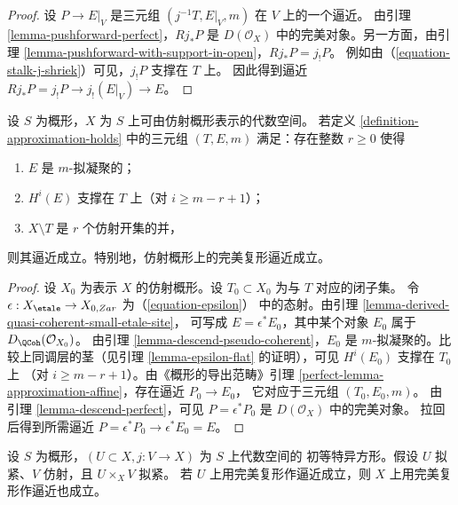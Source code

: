 \begin{proof}
设 $P \to E|_V$ 是三元组 $(j^{-1}T, E|_V, m)$ 在 $V$ 上的一个逼近。
由引理 \ref{lemma-pushforward-perfect}，$Rj_*P$ 是
$D(\mathcal{O}_X)$ 中的完美对象。另一方面，由引理
\ref{lemma-pushforward-with-support-in-open}，$Rj_*P = j_!P$。
例如由（\ref{equation-stalk-j-shriek}）可见，$j_!P$ 支撑在 $T$ 上。
因此得到逼近 $Rj_*P = j_!P \to j_!(E|_V) \to E$。
\end{proof}

\begin{lemma}
\label{lemma-approximation-affine}
设 $S$ 为概形，$X$ 为 $S$ 上可由仿射概形表示的代数空间。
若定义 \ref{definition-approximation-holds} 中的三元组
$(T, E, m)$ 满足：存在整数 $r \geq 0$ 使得
\begin{enumerate}
\item $E$ 是 $m$-拟凝聚的；
\item $H^i(E)$ 支撑在 $T$ 上（对 $i \geq m - r + 1$）；
\item $X \setminus T$ 是 $r$ 个仿射开集的并，
\end{enumerate}
则其逼近成立。特别地，仿射概形上的完美复形逼近成立。
\end{lemma}

\begin{proof}
设 $X_0$ 为表示 $X$ 的仿射概形。设 $T_0 \subset X_0$
为与 $T$ 对应的闭子集。%
令 $\epsilon : X_\etale \to X_{0, Zar}$ 为（\ref{equation-epsilon}）
中的态射。由引理 \ref{lemma-derived-quasi-coherent-small-etale-site}，
可写成 $E = \epsilon^*E_0$，其中某个对象 $E_0$ 属于
$D_\QCoh(\mathcal{O}_{X_0})$。
由引理 \ref{lemma-descend-pseudo-coherent}，$E_0$ 是
$m$-拟凝聚的。比较上同调层的茎（见引理
\ref{lemma-epsilon-flat} 的证明），可见 $H^i(E_0)$ 支撑在 $T_0$ 上
（对 $i \geq m - r + 1$）。由《概形的导出范畴》引理
\ref{perfect-lemma-approximation-affine}，存在逼近 $P_0 \to E_0$，
它对应于三元组 $(T_0, E_0, m)$。
由引理 \ref{lemma-descend-perfect}，可见
$P = \epsilon^*P_0$ 是 $D(\mathcal{O}_X)$ 中的完美对象。
拉回后得到所需逼近 $P = \epsilon^*P_0 \to \epsilon^*E_0 = E$。
\end{proof}

\begin{lemma}
\label{lemma-induction-step}
设 $S$ 为概形，$(U \subset X, j : V \to X)$ 为 $S$ 上代数空间的
初等特异方形。假设 $U$ 拟紧、$V$ 仿射，且 $U \times_X V$ 拟紧。
若 $U$ 上用完美复形作逼近成立，则 $X$ 上用完美复形作逼近也成立。
\end{lemma}

